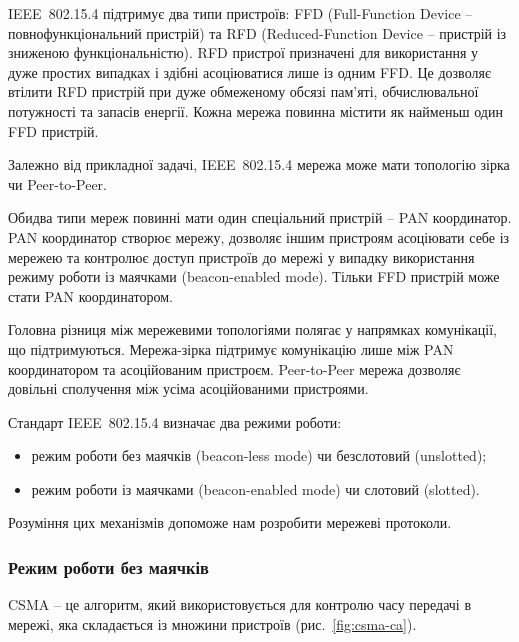 \documentclass[a4paper,ukrainian,utf8,nocolumnsxix,floatsection,equationsection]{eskdtext}
\renewcommand\paragraph{\subsubsection}
\newcommand{\figref}[1]{рис.~\ref{#1}}
\newcommand{\iee}[0]{IEEE~802.15.4\xspace}
\begin{document}
\iee підтримує два типи пристроїв: FFD (Full-Function Device – повнофункціональний пристрій) та RFD (Reduced-Function Device – пристрій із зниженою функціональністю). RFD пристрої призначені для використання у дуже простих випадках і здібні асоціюватися лише із одним FFD. Це дозволяє втілити RFD пристрій при дуже обмеженому обсязі пам’яті, обчислювальної потужності та запасів енергії. Кожна мережа повинна містити як найменьш один FFD пристрій. 

Залежно від прикладної задачі, \iee мережа може мати топологію зірка чи Peer-to-Peer. 

Обидва типи мереж повинні мати один спеціальний пристрій – PAN координатор. PAN координатор створює мережу, дозволяє іншим пристроям асоціювати себе із мережею та контролює доступ пристроїв до мережі у випадку використання режиму роботи із маячками (beacon-enabled mode). Тільки FFD пристрій може стати PAN координатором.

Головна різниця між мережевими топологіями полягає у напрямках комунікації, що підтримуються. Мережа-зірка підтримує комунікацію лише між PAN координатором та асоційованим пристроєм. Peer-to-Peer мережа дозволяє довільні сполучення між усіма асоційованими пристроями.

Стандарт \iee визначає два режими роботи:
\begin{itemize}
	\item режим роботи без маячків (beacon-less mode) чи безслотовий (unslotted);
	\item режим роботи із маячками (beacon-enabled mode) чи слотовий (slotted).
\end{itemize}

Розуміння цих механізмів допоможе нам розробити мережеві протоколи.


\paragraph{Режим роботи без маячків}

CSMA – це алгоритм, який використовується для контролю часу передачі в мережі, яка складається із множини пристроїв (\figref{fig:csma-ca}).
\end{document}
